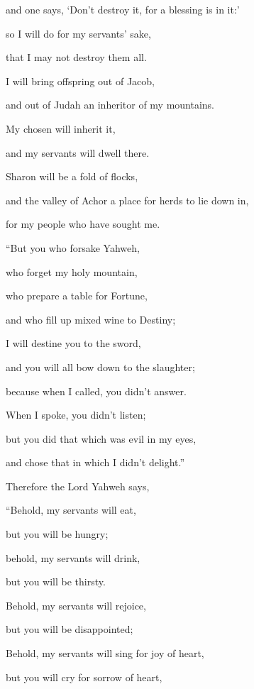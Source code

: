 {\par }{\QB and one says, ‘Don’t destroy it, for a blessing is in it:’
\par }{\Q so I will do for my servants’ sake,
\par }{\QB that I may not destroy them all.
\par }{\Q {}I will bring offspring out of Jacob,
\par }{\QB and out of Judah an inheritor of my mountains.
\par }{\Q My chosen will inherit it,
\par }{\QB and my servants will dwell there.
\par }{\Q {}Sharon will be a fold of flocks,
\par }{\QB and the valley of Achor a place for herds to lie down in,
\par }{\QB for my people who have sought me.
\par }{\BB \par }{\Q {}“But you who forsake Yahweh,
\par }{\QB who forget my holy mountain,
\par }{\QB who prepare a table for Fortune,
\par }{\QB and who fill up mixed wine to Destiny;
\par }{\Q {}I will destine you to the sword,
\par }{\QB and you will all bow down to the slaughter;
\par }{\Q because when I called, you didn’t answer.
\par }{\QB When I spoke, you didn’t listen;
\par }{\Q but you did that which was evil in my eyes,
\par }{\QB and chose that in which I didn’t delight.”
\par }{\BB \par }{\PP {}Therefore the Lord Yahweh says,
\par }{\Q “Behold, my servants will eat,
\par }{\QB but you will be hungry;
\par }{\Q behold, my servants will drink,
\par }{\QB but you will be thirsty.
\par }{\Q Behold, my servants will rejoice,
\par }{\QB but you will be disappointed;
\par }{\Q {}Behold, my servants will sing for joy of heart,
\par }{\QB but you will cry for sorrow of heart,
}
